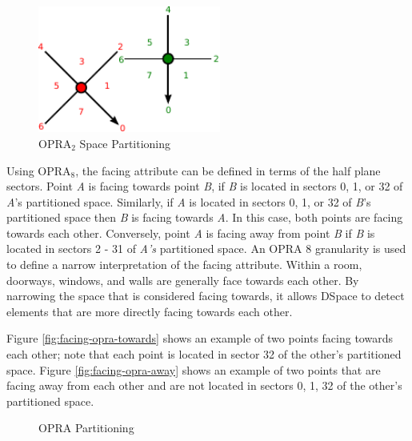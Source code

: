 \documentclass[12pt]{ucthesis}
\begin{document}
\begin{figure}[H]
\centering
\includegraphics[width=60mm]{facing-opra-base-rel}
\caption{OPRA$_{2}$ Space Partitioning}
\label{facing-opra-base-rel}
\end{figure}

Using OPRA$_{8}$, the facing attribute can be defined in terms of the half plane sectors. Point \emph{A} is facing towards point \emph{B}, if \emph{B} is located in sectors 0, 1, or 32 of \emph{A}'s partitioned space. Similarly, if \emph{A} is located in sectors 0, 1, or 32 of \emph{B}'s partitioned space then \emph{B} is facing towards \emph{A}. In this case, both points are facing towards each other. Conversely, point \emph{A} is facing away from point \emph{B} if \emph{B} is located in sectors 2 - 31 of \emph{A's} partitioned space. An OPRA 8 granularity is used to define a narrow interpretation of the facing attribute. Within a room, doorways, windows, and walls are generally face towards each other. By narrowing the space that is considered facing towards, it allows DSpace to detect elements that are more directly facing towards each other.

Figure \ref{fig:facing-opra-towards} shows an example of two points facing towards each other; note that each point is located in sector 32 of the other's partitioned space.  Figure \ref{fig:facing-opra-away} shows an example of two points that are facing away from each other and are not located in sectors 0, 1, 32 of the other's partitioned space. 

\begin{figure}[H]
 \centering
  \hspace{10 mm}
 \caption{OPRA Partitioning }
\label{opra-facing}
\end{figure}
\end{document}
